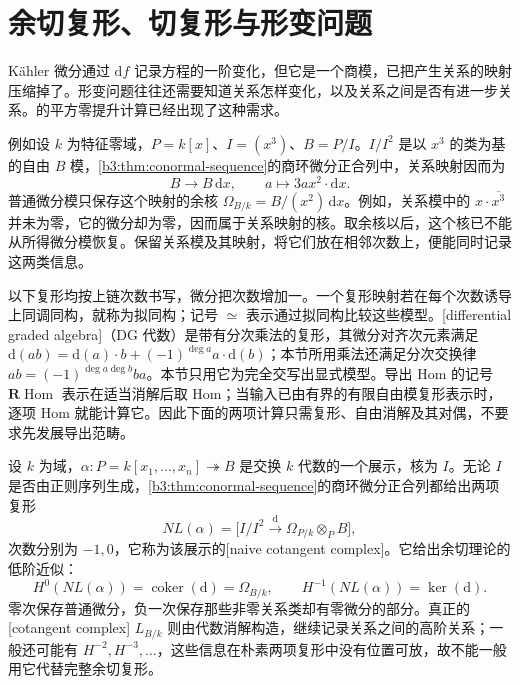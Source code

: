 
\section{余切复形、切复形与形变问题}
\label{b3:sec:C03}

%
%
%



Kähler 微分通过 \(\mathrm{d}f\) 记录方程的一阶变化，但它是一个商模，已把产生关系的映射压缩掉了。形变问题往往还需要知道关系怎样变化，以及关系之间是否有进一步关系。的平方零提升计算已经出现了这种需求。

\ProseParagraphBreak
例如设 \(k\) 为特征零域，\(P=k[x]\)、\(I=(x^3)\)、\(B=P/I\)。\(I/I^2\) 是以 \(x^3\) 的类为基的自由 \(B\) 模，\cref{b3:thm:conormal-sequence}的商环微分正合列中，关系映射因而为
\[
	B\longrightarrow B\,\mathrm{d}x, \qquad a\longmapsto 3ax^2\cdot\mathrm{d}x.
\]
普通微分模只保存这个映射的余核 \(\Omega_{B/k}=B/(x^2)\,\mathrm{d}x\)。例如，关系模中的 \(x\cdot\overline{x^3}\) 并未为零，它的微分却为零，因而属于关系映射的核。取余核以后，这个核已不能从所得微分模恢复。保留关系模及其映射，将它们放在相邻次数上，便能同时记录这两类信息。

\ProseParagraphBreak
以下复形均按上链次数书写，微分把次数增加一。一个复形映射若在每个次数诱导上同调同构，就称为拟同构；记号 \(\simeq\) 表示通过拟同构比较这些模型。[differential graded algebra]（DG 代数）是带有分次乘法的复形，其微分对齐次元素满足 \(\mathrm{d}(ab)=\mathrm{d}(a)\cdot b+(-1)^{\deg a}a\cdot\mathrm{d}(b)\)；本节所用乘法还满足分次交换律 \(ab=(-1)^{\deg a\deg b}ba\)。本节只用它为完全交写出显式模型。导出 Hom 的记号 \(\mathbf R\operatorname{Hom}\) 表示在适当消解后取 Hom；当输入已由有界的有限自由模复形表示时，逐项 Hom 就能计算它。因此下面的两项计算只需复形、自由消解及其对偶，不要求先发展导出范畴。

\ProseParagraphBreak
设 \(k\) 为域，\(\alpha:P=k[x_1,\ldots,x_n]\twoheadrightarrow B\) 是交换 \(k\) 代数的一个展示，核为 \(I\)。无论 \(I\) 是否由正则序列生成，\cref{b3:thm:conormal-sequence}的商环微分正合列都给出两项复形
\[
	NL(\alpha)=\bigl[I/I^2\xrightarrow{\mathrm{d}}\Omega_{P/k}\otimes_PB\bigr],
\]
次数分别为 \(-1,0\)，它称为该展示的[naive cotangent complex]。它给出余切理论的低阶近似：
\[
	H^0(NL(\alpha))=\operatorname{coker}(\mathrm{d})=\Omega_{B/k}, \qquad H^{-1}(NL(\alpha))=\ker(\mathrm{d}).
\]
零次保存普通微分，负一次保存那些非零关系类却有零微分的部分。真正的[cotangent complex] \(L_{B/k}\) 则由代数消解构造，继续记录关系之间的高阶关系；一般还可能有 \(H^{-2},H^{-3},\ldots\)，这些信息在朴素两项复形中没有位置可放，故不能一般用它代替完整余切复形。

